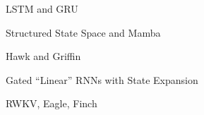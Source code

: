\begin{slidewhite}[\slideopts, toc={LSTM \& GRU}]{LSTM and GRU}
\vspace{-6em}
\end{slidewhite}

\begin{slidewhite}[\slideopts, toc={SSM \& Mamba}]{Structured State Space and Mamba}
\vspace{-6em}
\end{slidewhite}

\begin{slidewhite}[\slideopts,toc={Hawk \& Griffin}]{Hawk and Griffin}
\vspace{-6em}
\end{slidewhite}

\begin{slidewhite}[\slideopts,toc={HGRN2}]{Gated ``Linear'' RNNs with State Expansion}
\vspace{-6em}
\end{slidewhite}

\begin{slidewhite}[\slideopts,toc={RWKV+}]{RWKV, Eagle, Finch}
\vspace{-6em}
\end{slidewhite}


%
%
%
%


\endinput
